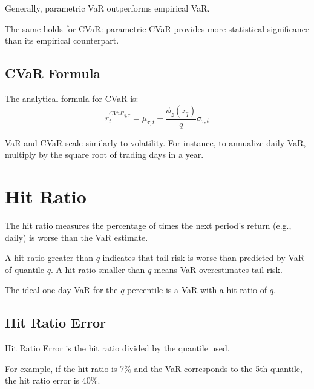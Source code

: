 \documentclass{article}
\begin{document}
Generally, parametric VaR outperforms empirical VaR.

The same holds for CVaR: parametric CVaR provides more statistical significance than its empirical counterpart.

\subsection{CVaR Formula}
The analytical formula for CVaR is:
$$ r_t^{CVaR_{q,\tau}} = \mu_{\tau,t} - \frac{\phi_z(z_q)}{q} \sigma_{\tau,t} $$

VaR and CVaR scale similarly to volatility. For instance, to annualize daily VaR, multiply by the square root of trading days in a year.

\section{Hit Ratio}
The hit ratio measures the percentage of times the next period’s return (e.g., daily) is worse than the VaR estimate.

A hit ratio greater than $q$ indicates that tail risk is worse than predicted by VaR of quantile $q$. A hit ratio smaller than $q$ means VaR overestimates tail risk.

The ideal one-day VaR for the $q$ percentile is a VaR with a hit ratio of $q$.

\subsection{Hit Ratio Error}
Hit Ratio Error is the hit ratio divided by the quantile used.

For example, if the hit ratio is 7\% and the VaR corresponds to the 5th quantile, the hit ratio error is 40\%.
\end{document}
